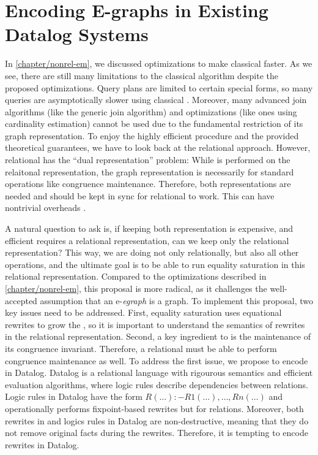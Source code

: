 \chapter{Encoding E-graphs in Existing Datalog Systems}\label{chapter/datalog}


In \autoref{chapter/nonrel-em},
 we discussed optimizations to make classical \ematching faster. 
As we see, there are still many limitations to the classical \ematching algorithm
 despite the proposed optimizations.
Query plans are limited to certain special forms,
 so many queries are asymptotically slower using classical \ematching.
Moreover,
 many advanced join algorithms (like the generic join algorithm) 
 and optimizations (like ones using cardinality estimation) cannot be used
 due to the fundamental restriction of its graph representation.
To enjoy the highly efficient \ematching procedure and the provided theoretical guarantees,
 we have to look back at the relational \ematching approach.
However,
 relational \ematching has the ``dual representation'' problem:
While \ematching is performed on the relaitonal representation,
 the graph representation is necessarily for standard \egraph operations
 like congruence maintenance.
Therefore,
 both representations are needed and should be kept in sync
 for relational \ematching to work.
This can have nontrivial overheads \citep{relational-ematching}.

A natural question to ask is, 
 if keeping both representation is expensive, 
 and efficient \ematching requires a relational representation,
 can we keep only the relational representation?
This way, 
 we are doing not only \ematching relationally,
 but also all other \egraph operations,
 and the ultimate goal is to be able to run equality saturation
 in this relational representation.
Compared to the optimizations described in \autoref{chapter/nonrel-em},
 this proposal is more radical,
 as it challenges the well-accepted assumption that an e-\textit{egraph} is a graph.
To implement this proposal, two key issues need to be addressed.
First,
 equality saturation uses equational rewrites to grow the \egraph,
 so it is important to understand the semantics of rewrites 
 in the relational representation.
Second,
 a key ingredient to \egraphs is the maintenance of its congruence invariant.
Therefore,
 a relational \egraph must be able to perform congruence maintenance as well.
To address the first issue, 
 we propose to encode \egraphs in Datalog.
Datalog is a relational language with rigourous semantics and efficient evaluation algorithms,
 where logic rules describe dependencies between relations.
Logic rules in Datalog have the form $R(\ldots) :- R1(\ldots),\ldots,Rn(\ldots)$ and
 operationally performs fixpoint-based rewrites but for relations.
Moreover, both rewrites in \egraphs and logics rules in Datalog are non-destructive,
 meaning that they do not remove original facts during the rewrites.
Therefore,
 it is tempting to encode \egraph rewrites in Datalog.

